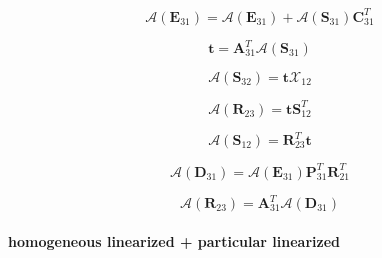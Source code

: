 \begin{equation}
\mathcal{A}(\mathbf{E}_{31}) = \mathcal{A}(\mathbf{E}_{31}) + \mathcal{A}(\mathbf{S}_{31})\mathbf{C}^{T}_{31}
\label{eq:adding-upward-adjoint_of_tangent_linear-particular_linearized_p_homogeneous_linearized-E31_a3}
\end{equation}

\begin{equation}
\mathbf{t} = \mathbf{A}^{T}_{31}\mathcal{A}(\mathbf{S}_{31})
\label{eq:adding-upward-adjoint_of_tangent_linear-particular_linearized_p_homogeneous_linearized-t}
\end{equation}

\begin{equation}
\mathcal{A}(\mathbf{S}_{32}) = \mathbf{t}\mathcal{X}_{12}
\label{eq:adding-upward-adjoint_of_tangent_linear-particular_linearized_p_homogeneous_linearized-S32_a}
\end{equation}

\begin{equation}
\mathcal{A}(\mathbf{R}_{23}) = \mathbf{t}\mathbf{S}^{T}_{12}
\label{eq:adding-upward-adjoint_of_tangent_linear-particular_linearized_p_homogeneous_linearized-R23_a}
\end{equation}

\begin{equation}
\mathcal{A}(\mathbf{S}_{12}) = \mathbf{R}^{T}_{23}\mathbf{t}
\label{eq:adding-upward-adjoint_of_tangent_linear-particular_linearized_p_homogeneous_linearized-S12_a}
\end{equation}

\begin{equation}
\mathcal{A}(\mathbf{D}_{31}) = \mathcal{A}(\mathbf{E}_{31})\mathbf{P}^{T}_{31}\mathbf{R}^{T}_{21}
\label{eq:adding-upward-adjoint_of_tangent_linear-particular_linearized_p_homogeneous_linearized-D31_a}
\end{equation}

\begin{equation}
\mathcal{A}(\mathbf{R}_{23}) = \mathbf{A}^{T}_{31}\mathcal{A}(\mathbf{D}_{31})
\label{eq:adding-upward-adjoint_of_tangent_linear-particular_linearized_p_homogeneous_linearized-R23_a}
\end{equation}


\paragraph{homogeneous linearized + particular linearized}
\label{sec:adding-upward-adjoint_of_tangent_linear-homogeneous_linearized_p_particular_linearized}

